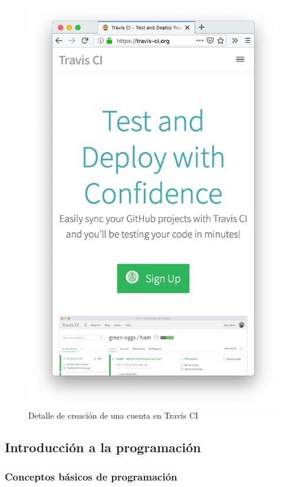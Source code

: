 \begin{figure}[H]
\centering
\includegraphics[width=1.0\textwidth]{../images/travis_signup}
\caption{Detalle de creación de una cuenta en Travis CI}
\label{fig:travis_signup}
\end{figure}



\subsection{Introducción a la programación}

\subsubsection{Conceptos básicos de programación}
